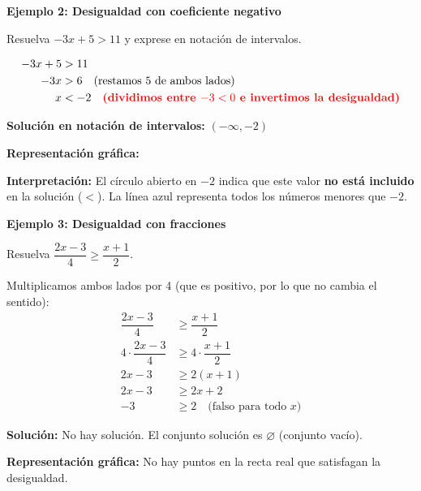 \newpage
\begin{example}
\textbf{Ejemplo 2: Desigualdad con coeficiente negativo}

Resuelva $-3x + 5 > 11$ y exprese en notación de intervalos.

\solution
\begin{align*}
-3x + 5 &> 11 \\
-3x &> 6 \quad \text{(restamos 5 de ambos lados)} \\
x &< -2 \quad \textcolor{red}{\textbf{(dividimos entre $-3 < 0$ e invertimos la desigualdad)}}
\end{align*}

\textbf{Solución en notación de intervalos:} $(-\infty, -2)$

\textbf{Representación gráfica:}

\begin{center}
\end{center}

\textbf{Interpretación:} El círculo abierto en $-2$ indica que este valor \textbf{no está incluido} en la solución ($<$). La línea azul representa todos los números menores que $-2$.
\end{example}


\begin{example}
\textbf{Ejemplo 3: Desigualdad con fracciones}

Resuelva $\dfrac{2x - 3}{4} \ge \dfrac{x + 1}{2}$.

\solution

Multiplicamos ambos lados por 4 (que es positivo, por lo que no cambia el sentido):
\begin{align*}
\dfrac{2x - 3}{4} &\ge \dfrac{x + 1}{2} \\
4 \cdot \dfrac{2x - 3}{4} &\ge 4 \cdot \dfrac{x + 1}{2} \\
2x - 3 &\ge 2(x + 1) \\
2x - 3 &\ge 2x + 2 \\
-3 &\ge 2 \quad \text{(falso para todo $x$)}
\end{align*}

\textbf{Solución:} No hay solución. El conjunto solución es $\varnothing$ (conjunto vacío).

\textbf{Representación gráfica:} No hay puntos en la recta real que satisfagan la desigualdad.
\end{example}

